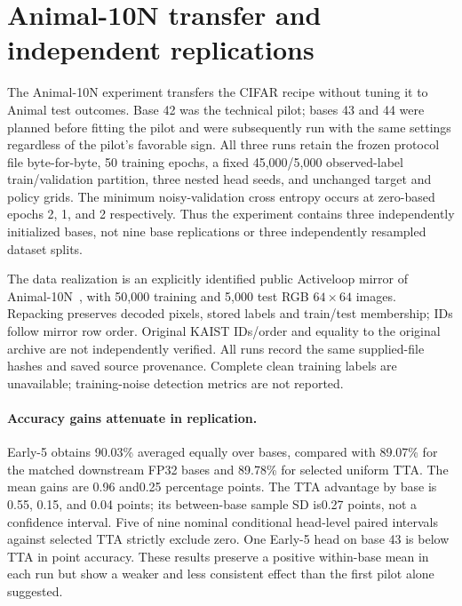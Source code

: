 \section{Animal-10N transfer and independent replications}
\label{sec:animalpilot}
The Animal-10N experiment transfers the CIFAR recipe without tuning it to Animal test outcomes. Base 42 was the technical pilot; bases 43 and 44 were planned before fitting the pilot and were subsequently run with the same settings regardless of the pilot's favorable sign. All three runs retain the frozen protocol file byte-for-byte, 50 training epochs, a fixed 45,000/5,000 observed-label train/validation partition, three nested head seeds, and unchanged target and policy grids. The minimum noisy-validation cross entropy occurs at zero-based epochs 2, 1, and 2 respectively. Thus the experiment contains three independently initialized bases, not nine base replications or three independently resampled dataset splits.

The data realization is an explicitly identified public Activeloop mirror of Animal-10N~\citep{song2019selfie}, with 50,000 training and 5,000 test RGB $64\times64$ images. Repacking preserves decoded pixels, stored labels and train/test membership; IDs follow mirror row order. Original KAIST IDs/order and equality to the original archive are not independently verified. All runs record the same supplied-file hashes and saved source provenance. Complete clean training labels are unavailable; training-noise detection metrics are not reported.

\begin{table}[t]
\centering
\small

\caption{Animal-10N accuracy (\%) by independent base and equal-base mean, followed by mean original-view base-error AUROC. Learned rows first average three heads within each base. Every method selects its own budget and temperature on noisy validation.}
\label{tab:animalpilot}
\end{table}

\paragraph{Accuracy gains attenuate in replication.}
Early-5 obtains 90.03\% averaged equally over bases, compared with 89.07\% for the matched downstream FP32 bases and 89.78\% for selected uniform TTA. The mean gains are 0.96 and0.25 percentage points. The TTA advantage by base is 0.55, 0.15, and 0.04 points; its between-base sample SD is0.27 points, not a confidence interval. Five of nine nominal conditional head-level paired intervals against selected TTA strictly exclude zero. One Early-5 head on base 43 is below TTA in point accuracy. These results preserve a positive within-base mean in each run but show a weaker and less consistent effect than the first pilot alone suggested.

